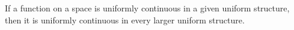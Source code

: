 If a function on a space is uniformly continuous in a given uniform structure, then it is uniformly continuous in every larger uniform structure.
